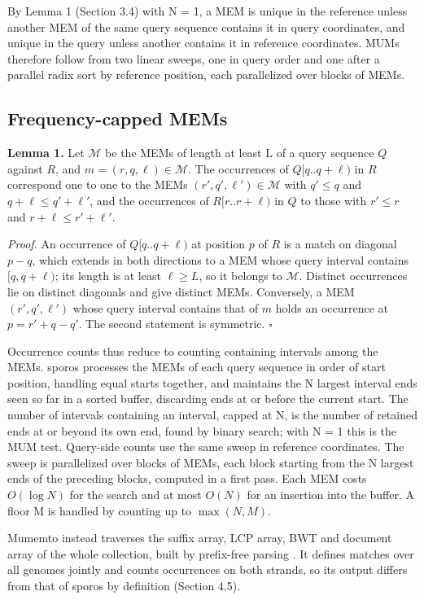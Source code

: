 By Lemma 1 (Section 3.4) with N = 1, a MEM is unique in the reference unless another MEM of the same query sequence contains it in query coordinates, and unique in the query unless another contains it in reference coordinates. MUMs therefore follow from two linear sweeps, one in query order and one after a parallel radix sort by reference position, each parallelized over blocks of MEMs.

\subsection{Frequency-capped MEMs}

\textbf{Lemma 1.} Let \(\mathcal{M}\) be the MEMs of length at least L of a query sequence \(Q\) against \(R\), and \(m = (r, q, \ell) \in \mathcal{M}\). The occurrences of \(Q[q..q+\ell)\) in \(R\) correspond one to one to the MEMs \((r', q', \ell') \in \mathcal{M}\) with \(q' \le q\) and \(q + \ell \le q' + \ell'\), and the occurrences of \(R[r..r+\ell)\) in \(Q\) to those with \(r' \le r\) and \(r + \ell \le r' + \ell'\).

\emph{Proof.} An occurrence of \(Q[q..q+\ell)\) at position \(p\) of \(R\) is a match on diagonal \(p - q\), which extends in both directions to a MEM whose query interval contains \([q, q+\ell)\); its length is at least \(\ell \ge L\), so it belongs to \(\mathcal{M}\). Distinct occurrences lie on distinct diagonals and give distinct MEMs. Conversely, a MEM \((r', q', \ell')\) whose query interval contains that of \(m\) holds an occurrence at \(p = r' + q - q'\). The second statement is symmetric. \(\square\)

Occurrence counts thus reduce to counting containing intervals among the MEMs. sporos processes the MEMs of each query sequence in order of start position, handling equal starts together, and maintains the N largest interval ends seen so far in a sorted buffer, discarding ends at or before the current start. The number of intervals containing an interval, capped at N, is the number of retained ends at or beyond its own end, found by binary search; with N = 1 this is the MUM test. Query-side counts use the same sweep in reference coordinates. The sweep is parallelized over blocks of MEMs, each block starting from the N largest ends of the preceding blocks, computed in a first pass. Each MEM costs \(O(\log N)\) for the search and at most \(O(N)\) for an insertion into the buffer. A floor M is handled by counting up to \(\max(N, M)\).

Mumemto instead traverses the suffix array, LCP array, BWT and document array of the whole collection, built by prefix-free parsing \citep{Shivakumar2025}. It defines matches over all genomes jointly and counts occurrences on both strands, so its output differs from that of sporos by definition (Section 4.5).

